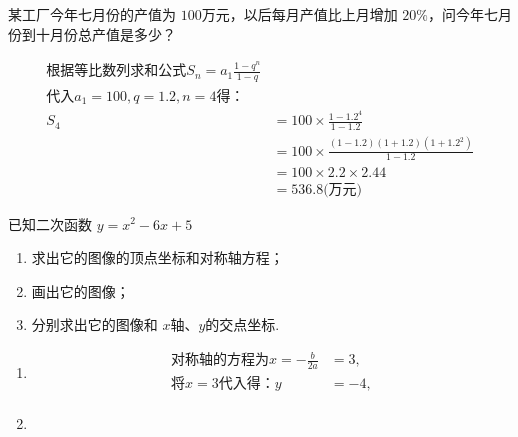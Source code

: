 \documentclass[answers]{exam}
\begin{document}
\begin{questions}
	\question 某工厂今年七月份的产值为 \( 100 \)万元，以后每月产值比上月增加 \( 20\%
	\)，问今年七月份到十月份总产值是多少？

	\begin{solution}
		\begin{align*}
			\text{根据等比数列求和公式} S_n = a_1\frac{1- q^n}{1-q}          \\
			\text{代入}  a_1 = 100, q = 1.2, n = 4  \text{得：}              \\
			S_4 & = 100 \times \frac{1 - 1.2^4}{1 - 1.2}                     \\
			    & = 100 \times \frac{(1 - 1.2)(1 + 1.2)(1 + 1.2^2)}{1 - 1.2} \\
			    & = 100 \times 2.2 \times 2.44                               \\
			    & = 536.8 \text{(万元)}
		\end{align*}

	\end{solution}

	\question 已知二次函数 \( y = x^2 - 6x + 5 \)
	\begin{enumerate}[label=(\arabic*)]
		\item 求出它的图像的顶点坐标和对称轴方程；
		\item 画出它的图像；
		\item 分别求出它的图像和 \( x \)轴、$ y $的交点坐标.
	\end{enumerate}

	\begin{solution}
		\begin{enumerate}[label=(\arabic*)]
			\item
			      \begin{align*}
				      \text{对称轴的方程为} x = -\frac{b}{2a} & = 3,  \\
				      \text{将} x = 3 \text{代入得：} y       & = -4, \\
			      \end{align*}
			\item
			      \begin{center}
			      \end{center}


\end{enumerate}
\end{solution}
\end{questions}
\end{document}
